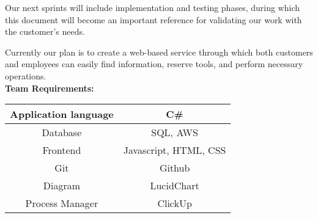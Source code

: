 \documentclass[12pt,letterpaper]{article}
\begin{document}
Our next sprints will include implementation and testing phases, during which this document will become an important reference for validating our work with the customer's needs.

Currently our plan is to create a web-based service through which both customers and employees can easily find information, reserve tools, and perform necessary operations.\\
    
\textbf{Team Requirements:}

\begin{tabular}{|c|c|}
    \hline
    Application language &  C\#\\
    \hline
    Database & SQL, AWS\\
    \hline
    Frontend & Javascript, HTML, CSS\\
    \hline
    Git & Github\\
    \hline
    Diagram & LucidChart\\
    \hline
    Process Manager & ClickUp\\
    \hline
\end{tabular}
\end{document}
